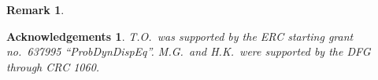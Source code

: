 \documentclass[letterpaper, 11pt,  reqno]{amsart}
\newtheorem{remark}[theorem]{Remark}
\newcommand{\1}{\hspace{0.5mm}\text{I}\hspace{0.5mm}}
\newcommand{\noi}{\noindent}
\newcommand{\eps}{\varepsilon}
\newcommand{\wt}{\widetilde}
\newtheorem*{ackno}{Acknowledgements}
\numberwithin{equation}{section}
\numberwithin{theorem}{section}
\begin{document}
\begin{remark}
 
%
%
\end{remark}

\begin{ackno}\rm
T.O.~was supported by the ERC starting grant 
no.~637995 ``ProbDynDispEq''.
M.G.~and H.K.~were supported by the DFG through CRC 1060.

\end{ackno}
\end{document}
